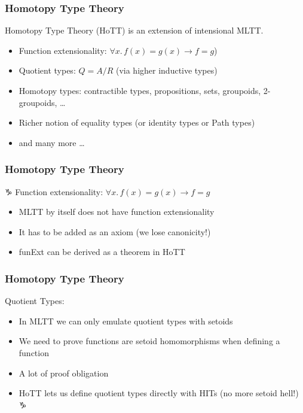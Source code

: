 \documentclass[9pt]{beamer}
\begin{document}
\begin{frame}
\frametitle{Homotopy Type Theory}

Homotopy Type Theory (HoTT) is an extension of intensional MLTT.

\begin{itemize}

  \item Function extensionality: $\forall x. \, f(x) = g(x) \rightarrow f = g$)

  \item Quotient types: $Q = A / R$ (via higher inductive types)

  \item Homotopy types: contractible types, propositions, sets, groupoids, 2-groupoids, \ldots

  \item Richer notion of equality types (or identity types or Path types)

  \item and many more \ldots

\end{itemize}

\end{frame}

\begin{frame}
\frametitle{Homotopy Type Theory}
♑
Function extensionality: $\forall x. \, f(x) = g(x) \rightarrow f = g$

\begin{itemize}

  \item MLTT by itself does not have function extensionality

  \item It has to be added as an axiom (we lose canonicity!)

  \item<2-> funExt can be derived as a theorem in HoTT

\end{itemize}

\end{frame}

\begin{frame}
\frametitle{Homotopy Type Theory}

Quotient Types:

\begin{itemize}

  \item In MLTT we can only emulate quotient types with setoids
  \item We need to prove functions are setoid homomorphisms when defining a function
  \item A lot of proof obligation
  \item<2-> HoTT lets us define quotient types directly with HITs (no more setoid hell!)
♑
\end{itemize}

\end{frame}
\end{document}

